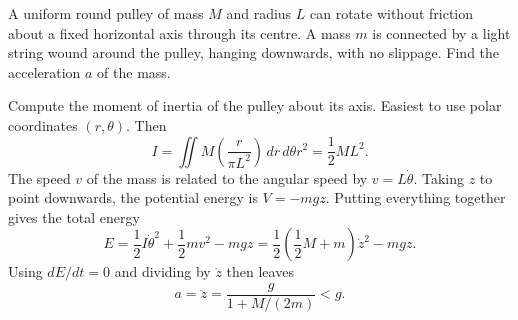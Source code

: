 \documentclass[10pt, a4paper]{article}
\begin{document}
\begin{example}
    A uniform round pulley of mass $M$ and radius $L$ can rotate without friction about a fixed horizontal axis through its centre.
    A mass $m$ is connected by a light string wound around the pulley,
    hanging downwards,
    with no slippage.
    Find the acceleration $a$ of the mass.

    \begin{solution}
        Compute the moment of inertia of the pulley about its axis.
        Easiest to use polar coordinates $(r, \theta)$.
        Then
        \[
        I = \iint M\left(\frac{r}{\pi L ^ 2}\right)\,dr\,d\theta r ^ 2 = \frac{1}{2}ML ^ 2.
        \]
        The speed $v$ of the mass is related to the angular speed by $v = L\dot{\theta}$.
        Taking $z$ to point downwards,
        the potential energy is $V = -mgz$.
        Putting everything together gives the total energy
        \[
        E = \frac{1}{2}I\dot{\theta} ^ 2 + \frac{1}{2}mv ^ 2 - mgz = \frac{1}{2}\left(\frac{1}{2}M + m\right)\dot{z} ^ 2 - mgz.
        \]
        Using $dE / dt = 0$ and dividing by $\dot{z}$ then leaves
        \[
        a = \ddot{z} = \frac{g}{1 + M / (2m)} < g.
        \]
    \end{solution}
\end{example}
\end{document}
